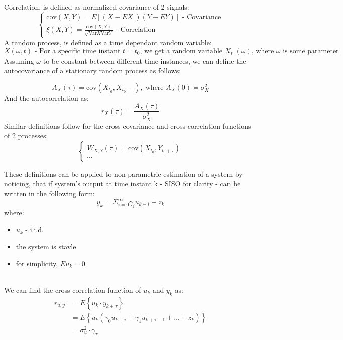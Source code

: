 {

    Correlation, is defined as normalized covariance of 2 signals:
    \begin{equation}
        \begin{cases}
            \text{cov}(X,Y) = E[(X-EX])(Y-EY)] \text{ - Covariance}\\
            \xi(X,Y) = \frac{\text{cov}(X,Y)}{\sqrt{\text{Var}X\text{Var}Y}} \text{ - Correlation}
        \end{cases}
    \end{equation}
    A random process, is defined as a time dependant random variable:
    \begin{equation}
        X(\omega,t) \text{ - For a specific time instant $t = t_0$, we get a random variable $X_{t_0}(\omega)$, where $\omega$ is some parameter}
    \end{equation}
Assuming $\omega$ to be constant between different time instances, we can define the autocovariance of a stationary random process as follows:

\begin{equation}
    A_X(\tau) = \text{cov}(X_{t_0},X_{t_0+\tau}),\;\text{where $A_X(0) = \sigma^{2}_X$}
\end{equation}
And the autocorrelation as:
\begin{equation}
    r_X(\tau) = \frac{A_X(\tau)}{\sigma^{2}_X}
\end{equation}
Similar definitions follow for the cross-covariance and cross-correlation functions of 2 processes:
\begin{equation}
    \begin{cases}
        W_{X,Y}(\tau) = \text{cov}(X_{t_0},Y_{t_0+\tau})\\
        \cdots 
    \end{cases}
\end{equation}

These definitions can be applied to non-parametric estimation of a system by noticing, that if system's output at time instant k - SISO for clarity - can be written in the following form:
\begin{equation}
    y_k = \Sigma^{\infty}_{i=0}\gamma_iu_{k-i} +z_k
\end{equation}
where:
\begin{itemize}
        \item $u_k$ - i.i.d.
        \item the system is stavle
        \item for simplicity, $Eu_k = 0$
\end{itemize}
\\
We can find the cross correlation function of $u_k$ and  $y_k$ as:
\begin{equation}
    \begin{aligned}
        r_{u,y} &   = E\left\{ u_k \cdot y_{k+\tau}\right\} \\
                &= E\left\{ u_k(\gamma_0 u_{k+\tau} + \gamma_1u_{k+\tau-1}+\dots+z_k)\right\}\\
                &= \sigma^{2}_u \cdot \gamma_\tau
    \end{aligned}
\end{equation}

}
